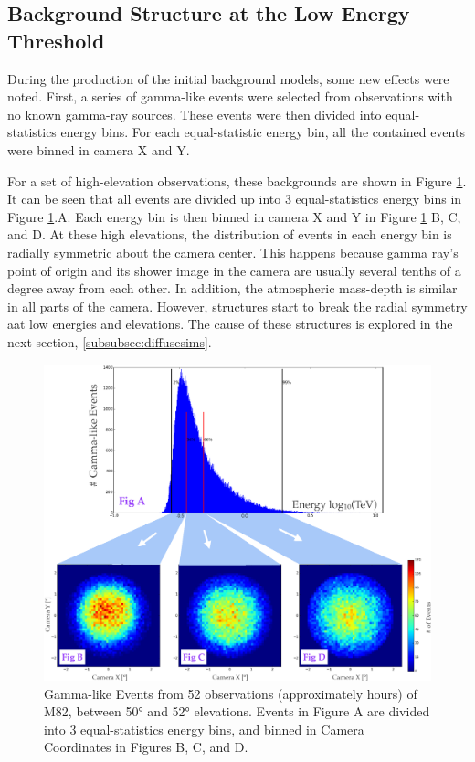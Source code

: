   \subsection{Background Structure at the Low Energy Threshold}
    During the production of the initial background models, some new effects were noted.
    First, a series of gamma-like events were selected from observations with no known gamma-ray sources.
    These events were then divided into equal-statistics energy bins.
    For each equal-statistic energy bin, all the contained events were binned in camera X and Y.

    For a set of high-elevation observations, these backgrounds are shown in Figure \ref{fig:back_highelev}.
    It can be seen that all events are divided up into 3 equal-statistics energy bins in Figure \ref{fig:back_highelev}.A.
    Each energy bin is then binned in camera X and Y in Figure \ref{fig:back_highelev} B, C, and D.
    At these high elevations, the distribution of events in each energy bin is radially symmetric about the camera center.
    This happens because gamma ray's point of origin and its shower image in the camera are usually several tenths of a degree away from each other.
    In addition, the atmospheric mass-depth is similar in all parts of the camera.
    However, structures start to break the radial symmetry aat low energies and elevations.
    The cause of these structures is explored in the next section, \ref{subsubsec:diffusesims}.

    \begin{figure}[ht]
      \centering
      \includegraphics[width=\textwidth]{images/ctools/backgrounds_highelev.eps}
      \caption[FITS Background at \ang{50} Elevation]{
        Gamma-like Events from 52 observations (approximately  hours) of M82, between \ang{50} and \ang{52} elevations.
        Events in Figure A are divided into 3 equal-statistics energy bins, and binned in Camera Coordinates in Figures B, C, and D.
      }
      \label{fig:back_highelev}
    \end{figure}


